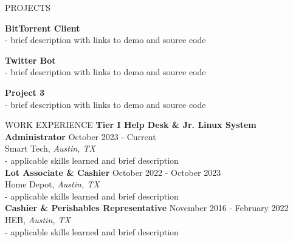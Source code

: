 \documentclass{resume} %
\begin{document}
\begin{rSection}{PROJECTS}
\vspace{-1.25em}
\item \textbf{BitTorrent Client}{} \\
- brief description with links to demo and source code
\item \textbf{Twitter Bot}{} \\
- brief description with links to demo and source code
\item \textbf{Project 3}{} \\
- brief description with links to demo and source code
\end{rSection} 

\begin{rSection}{WORK EXPERIENCE}
\textbf{Tier I Help Desk \& Jr. Linux System Administrator} \hfill October 2023 - Current \\
Smart Tech, \textit{Austin, TX} \\
    - applicable skills learned and brief description \\
\textbf{Lot Associate \& Cashier} \hfill October 2022 - October 2023 \\
Home Depot, \textit{Austin, TX} \\
    - applicable skills learned and brief description \\
\textbf{Cashier \& Perishables Representative} \hfill November 2016 - February 2022 \\
HEB, \textit{Austin, TX} \\
    - applicable skills learned and brief description
\end{rSection} 

\end{document}
